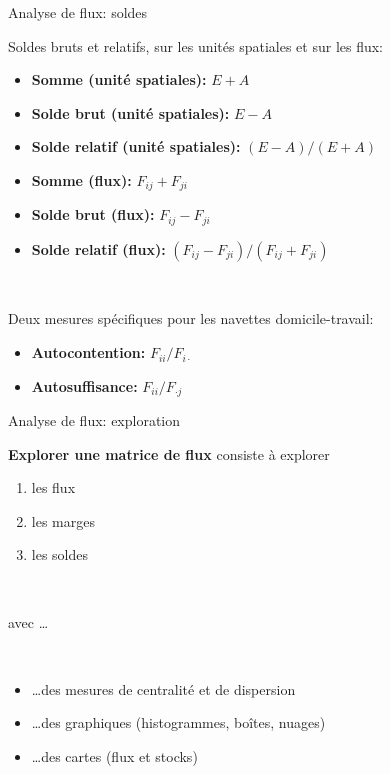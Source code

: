 \begin{frame}{Analyse de flux: soldes}

Soldes bruts et relatifs, sur les unités spatiales et sur les flux:

\begin{itemize}
  \item \textbf{Somme (unité spatiales):} $E+A$ 
  \item \textbf{Solde brut (unité spatiales):} $E-A$
  \item \textbf{Solde relatif (unité spatiales):} $(E-A)/(E+A)$ 
  \item \textbf{Somme (flux):} $F_{ij} + F_{ji}$
  \item \textbf{Solde brut (flux):} $F_{ij} - F_{ji}$
  \item \textbf{Solde relatif (flux):} $(F_{ij} - F_{ji}) / (F_{ij} + F_{ji})$
\end{itemize}

~

Deux mesures spécifiques pour les navettes domicile-travail:

\begin{itemize}
  \item \textbf{Autocontention:} $F_{ii} / F_{i \cdot}$
  \item \textbf{Autosuffisance:} $F_{ii} / F_{\cdot j}$
\end{itemize}

\end{frame}


\begin{frame}{Analyse de flux: exploration}

\textbf{Explorer une matrice de flux} consiste à explorer 

\begin{enumerate}
\item les flux
\item les marges
\item les soldes
\end{enumerate}

~ 

avec \ldots

~
\begin{itemize}
  \item \ldots des mesures de centralité et de dispersion
  \item \ldots des graphiques (histogrammes, boîtes, nuages)
  \item \ldots des cartes (flux et stocks)
\end{itemize}

\end{frame}



